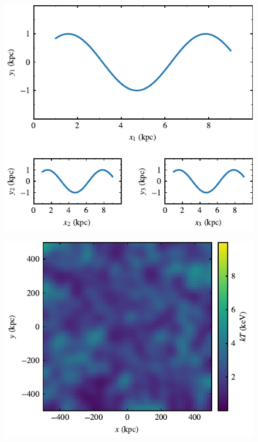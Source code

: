 \documentclass[usenatbib]{mnras}
\begin{document}
\begin{figure}
\includegraphics{../pdf/011.pdf}
\caption[]{\lipsum[66]}
\label{fig011}
\end{figure}

\lipsum[1-3]

\begin{figure}
\includegraphics{../pdf/012.pdf}
\caption[]{\lipsum[66]}
\label{fig012}
\end{figure}

\lipsum[1-3]
\end{document}
